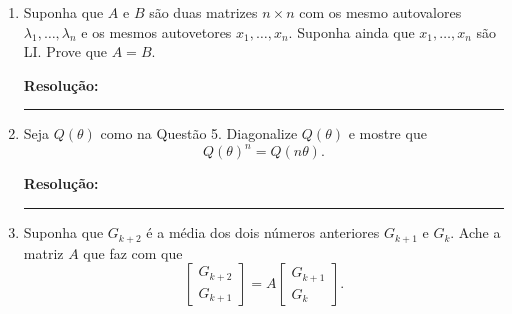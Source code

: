 \documentclass[leqno]{article}
\numberwithin{equation}{section}
\newenvironment{sol} 
{
    \vspace{4mm}
    \noindent\textbf{Resolução:}
    \strut\newline
    \smallskip
    \hspace{-3.5mm} 
} 
{\noindent\rule{4cm}{.1mm}}
\begin{document}
\begin{enumerate}
\begin{sol}

    
\end{sol}


\item Suponha que $A$ e $B$ são duas matrizes $n \times n$ com os mesmo autovalores $\lambda_1, \ldots, \lambda_n$ e os mesmos autovetores $x_1, \ldots, x_n$. Suponha ainda que $x_1, \ldots, x_n$ são LI. Prove que $A = B$.

\begin{sol}

    
\end{sol}



\item Seja $Q(\theta)$ como na Questão 5. Diagonalize $Q(\theta)$ e mostre que
$$Q(\theta)^n = Q(n\theta).$$

\begin{sol}

    
\end{sol}


\item Suponha que $G_{k+2}$ é a média dos dois números anteriores $G_{k+1}$ e $G_k$. Ache a matriz $A$ que faz com que
$$\begin{bmatrix}
G_{k+2}\\
G_{k+1}\end{bmatrix} = A \begin{bmatrix}
G_{k+1}\\
G_k\end{bmatrix}.$$


\end{enumerate}
\end{document}
